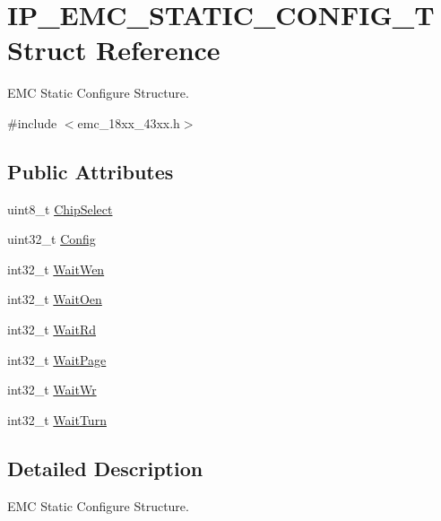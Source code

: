 \hypertarget{struct_i_p___e_m_c___s_t_a_t_i_c___c_o_n_f_i_g___t}{}\section{I\+P\+\_\+\+E\+M\+C\+\_\+\+S\+T\+A\+T\+I\+C\+\_\+\+C\+O\+N\+F\+I\+G\+\_\+T Struct Reference}
\label{struct_i_p___e_m_c___s_t_a_t_i_c___c_o_n_f_i_g___t}


E\+MC Static Configure Structure.  




{\ttfamily \#include $<$emc\+\_\+18xx\+\_\+43xx.\+h$>$}

\subsection*{Public Attributes}
\begin{DoxyCompactItemize}
\item 
uint8\+\_\+t \hyperlink{struct_i_p___e_m_c___s_t_a_t_i_c___c_o_n_f_i_g___t_a7354ba4f1dbfb6dfb9ba4429c0e4aacb}{Chip\+Select}
\item 
uint32\+\_\+t \hyperlink{struct_i_p___e_m_c___s_t_a_t_i_c___c_o_n_f_i_g___t_a680c7aa80e3eaed2d00afaca1e47b113}{Config}
\item 
int32\+\_\+t \hyperlink{struct_i_p___e_m_c___s_t_a_t_i_c___c_o_n_f_i_g___t_a1d254d80e206ac5f46e1e57a633116b5}{Wait\+Wen}
\item 
int32\+\_\+t \hyperlink{struct_i_p___e_m_c___s_t_a_t_i_c___c_o_n_f_i_g___t_a8cd060de97a180d69c3eecd3c6661016}{Wait\+Oen}
\item 
int32\+\_\+t \hyperlink{struct_i_p___e_m_c___s_t_a_t_i_c___c_o_n_f_i_g___t_a8135fca9ab8a1de91f987666370781f5}{Wait\+Rd}
\item 
int32\+\_\+t \hyperlink{struct_i_p___e_m_c___s_t_a_t_i_c___c_o_n_f_i_g___t_a9fb8c961943ee3f445656e30cdca972b}{Wait\+Page}
\item 
int32\+\_\+t \hyperlink{struct_i_p___e_m_c___s_t_a_t_i_c___c_o_n_f_i_g___t_a15780fe19712f2a43e68f9c2a212f686}{Wait\+Wr}
\item 
int32\+\_\+t \hyperlink{struct_i_p___e_m_c___s_t_a_t_i_c___c_o_n_f_i_g___t_af8a9ae7e02bb356a83979111fd980a1e}{Wait\+Turn}
\end{DoxyCompactItemize}


\subsection{Detailed Description}
E\+MC Static Configure Structure. 

